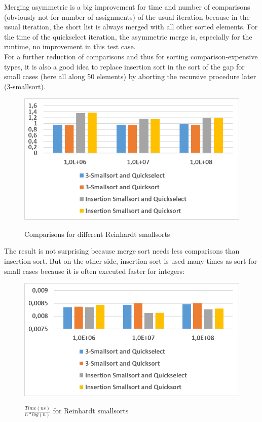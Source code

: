\documentclass[11pt,pdftex,a4paper, twocolumn]{article}
\begin{document}
Merging asymmetric is a big improvement for time and number of comparisons (obviously not for number of assignments) of the usual iteration because in the usual iteration, the short list is always merged with all other sorted elements. For the time of the quickselect iteration, the asymmetric merge is, especially for the runtime, no improvement in this test case. \\
For a further reduction of comparisons and thus for sorting comparison-expensive types, it is also a good idea to replace insertion sort in the sort of the gap for small cases (here all along 50 elements) by aborting the recursive procedure later (3-smallsort). \\
\begin{figure}[H]
\includegraphics[width=\linewidth]{Diagramm-Bilder/comparisons-diff-iter-and-smallsorts.JPG} \\
\caption{Comparisons for different Reinhardt smallsorts} \label{fig:comparisons-diff-iter-and-smallsorts}
\end{figure}
The result is not surprising because merge sort needs less comparisons than insertion sort. But on the other side, insertion sort is used many times as sort for small cases because it is often executed faster for integers: \\
\begin{figure}[H]
\includegraphics[width=\linewidth]{Diagramm-Bilder/time-diff-iter-and-smallsorts.JPG} \\
\caption{ $ \frac{Time(ns)}{n*log(n)} $ for Reinhardt smallsorts} \label{fig:time-diff-iter-and-smallsorts}
\end{figure}
\end{document}
